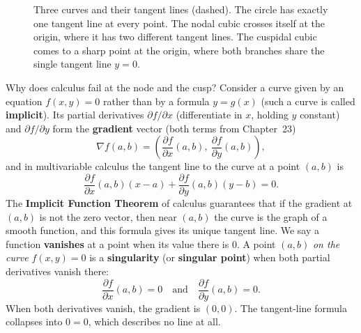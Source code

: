 \begin{figure}[htbp]
\caption{Three curves and their tangent lines (dashed). The circle has exactly one tangent line at every point. The nodal cubic crosses itself at the origin, where it has two different tangent lines. The cuspidal cubic comes to a sharp point at the origin, where both branches share the single tangent line $y = 0$.}
\label{24:fig-smooth-node-cusp}
\end{figure}

Why does calculus fail at the node and the cusp?
Consider a curve given by an equation $f(x, y) = 0$ rather than by a formula $y = g(x)$ (such a curve is called \textbf{implicit}). Its partial derivatives $\partial f / \partial x$ (differentiate in $x$, holding $y$ constant) and $\partial f / \partial y$ form the \textbf{gradient} vector (both terms from Chapter~23)
\[
\nabla f(a, b) = \left( \frac{\partial f}{\partial x}(a, b), \ \frac{\partial f}{\partial y}(a, b) \right),
\]
and in multivariable calculus the tangent line to the curve at a point $(a, b)$ is
\[
\frac{\partial f}{\partial x}(a, b)(x - a) + \frac{\partial f}{\partial y}(a, b)(y - b) = 0.
\]
The \textbf{Implicit Function Theorem} of calculus guarantees that if the gradient at $(a, b)$ is not the zero vector, then near $(a, b)$ the curve is the graph of a smooth function, and this formula gives its unique tangent line. We say a function \textbf{vanishes} at a point when its value there is $0$. A point $(a, b)$ \emph{on the curve} $f(x, y) = 0$ is a \textbf{singularity} (or \textbf{singular point}) when both partial derivatives vanish there:
\[
\frac{\partial f}{\partial x}(a, b) = 0 \quad \text{and} \quad \frac{\partial f}{\partial y}(a, b) = 0.
\]
When both derivatives vanish, the gradient is $(0, 0)$. The tangent-line formula collapses into $0 = 0$, which describes no line at all.

